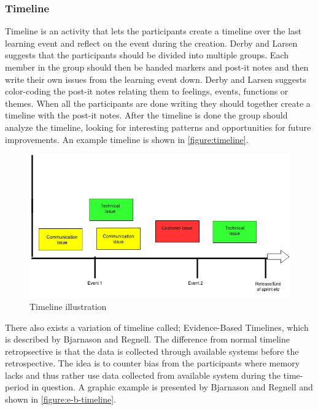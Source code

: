 \subsubsection{Timeline}
Timeline is an activity that lets the participants create a timeline over the last learning event and reflect on the event during the creation. Derby and Larsen\cite{Larsen2006} suggests that the participants should be divided into multiple groups. Each member in the group should then be handed markers and post-it notes and then write their own issues from the learning event down. Derby and Larsen suggests color-coding the post-it notes relating them to feelings, events, functions or themes. When all the participants are done writing they should together create a timeline with the post-it notes. After the timeline is done the group should analyze the timeline, looking for interesting patterns and opportunities for future improvements. An example timeline is shown in \autoref{figure:timeline}.

\begin{figure}[!h]
	\centering
	\includegraphics[width=\textwidth, keepaspectratio]{figures/Timeline-Example.png}
	\caption{Timeline illustration}
	\label{figure:timeline}
\end{figure}

There also exists a variation of timeline called; Evidence-Based Timelines, which is described by Bjarnason and Regnell\cite{Bjarnason2012}. The difference from normal timeline retropsective is that the data is collected through available systems before the retrospective. The idea is to counter bias from the participants where memory lacks and thus rather use data collected from available system during the time-period in question. A graphic example is presented by Bjarnason and Regnell and shown in \autoref{figure:e-b-timeline}. 

